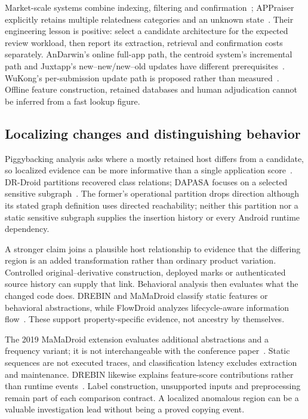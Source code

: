 Market-scale systems combine indexing, filtering and confirmation~\cite{accuracyclone,wukong,massvet}; APPraiser explicitly retains multiple relatedness categories and an unknown state~\cite{appraiser}. Their engineering lesson is positive: select a candidate architecture for the expected review workload, then report its extraction, retrieval and confirmation costs separately. AnDarwin's online full-app path, the centroid system's incremental path and Juxtapp's new--new/new--old updates have different prerequisites~\cite{andarwin,accuracyclone,juxtapp}. WuKong's per-submission update path is proposed rather than measured~\cite{wukong}. Offline feature construction, retained databases and human adjudication cannot be inferred from a fast lookup figure.

\subsection{Localizing changes and distinguishing behavior}

Piggybacking analysis asks where a mostly retained host differs from a candidate, so localized evidence can be more informative than a single application score~\cite{piggybacking}. DR-Droid partitions recovered class relations; DAPASA focuses on a selected sensitive subgraph~\cite{heterogeneity,dapasa}. The former's operational partition drops direction although its stated graph definition uses directed reachability; neither this partition nor a static sensitive subgraph supplies the insertion history or every Android runtime dependency.

A stronger claim joins a plausible host relationship to evidence that the differing region is an added transformation rather than ordinary product variation. Controlled original--derivative construction, deployed marks or authenticated source history can supply that link. Behavioral analysis then evaluates what the changed code does. DREBIN and MaMaDroid classify static features or behavioral abstractions, while FlowDroid analyzes lifecycle-aware information flow~\cite{drebin,mamadroid,flowdroid}. These support property-specific  evidence, not ancestry by themselves.

The 2019 MaMaDroid extension evaluates additional abstractions and a frequency variant; it is not interchangeable with the conference paper~\cite{mamadroid}. Static sequences are not executed traces, and classification latency excludes extraction and maintenance. DREBIN likewise explains feature-score contributions rather than runtime events~\cite{drebin}. Label construction, unsupported inputs and preprocessing remain part of each comparison contract. A localized anomalous region can be a valuable investigation lead without being a proved copying event.

